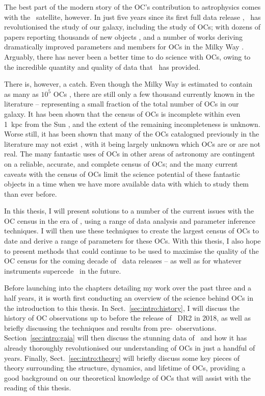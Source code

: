 The best part of the modern story of the OC's contribution to astrophysics comes with the \gaia\ satellite, however. In just five years since its first full data release \citep{brown_gaia_2018}, \gaia\ has revolutionised the study of our galaxy, including the study of OCs; with dozens of papers reporting thousands of new objects \citep[e.g.][]{liu_catalog_2019,castro-ginard_hunting_2019,castro-ginard_hunting_2020,castro-ginard_hunting_2022}, and a number of works deriving dramatically improved parameters and members for OCs in the Milky Way \citep[e.g.][]{cantat-gaudin_gaia_2018,tarricq_3d_2020}. Arguably, there has never been a better time to do science with OCs, owing to the incredible quantity and quality of data that \gaia\ has provided.

There is, however, a catch. Even though the Milky Way is estimated to contain as many as $10^5$ OCs \citep{dias_new_2002}, there are still only a few thousand currently known in the literature -- representing a small fraction of the total number of OCs in our galaxy. It has been shown that the census of OCs is incomplete within even 1~kpc from the Sun \citep[e.g.][]{castro-ginard_new_2018}, and the extent of the remaining incompleteness is unknown. Worse still, it has been shown that many of the OCs catalogued previously in the literature may not exist \citep{cantat-gaudin_clusters_2020,piatti_catching_2023}, with it being largely unknown which OCs are or are not real. The many fantastic uses of OCs in other areas of astronomy are contingent on a reliable, accurate, and complete census of OCs; and the many current caveats with the census of OCs limit the science potential of these fantastic objects in a time when we have more available data with which to study them than ever before.

In this thesis, I will present solutions to a number of the current issues with the OC census in the era of \gaia, using a range of data analysis and parameter inference techniques. I will then use these techniques to create the largest census of OCs to date and derive a range of parameters for these OCs. With this thesis, I also hope to present methods that could continue to be used to maximise the quality of the OC census for the coming decade of \gaia\ data releases -- as well as for whatever instruments supercede \gaia\ in the future.

Before launching into the chapters detailing my work over the past three and a half years, it is worth first conducting an overview of the science behind OCs in the introduction to this thesis. In Sect.~\ref{sec:intro:history}, I will discuss the history of OC observations up to before the release of \gaia\ DR2 in 2018, as well as briefly discussing the techniques and results from pre-\gaia\ observations. Section~\ref{sec:intro:gaia} will then discuss the stunning data of \gaia\ and how it has already thoroughly revolutionised our understanding of OCs in just a handful of years. Finally, Sect.~\ref{sec:intro:theory} will briefly discuss some key pieces of theory surrounding the structure, dynamics, and lifetime of OCs, providing a good background on our theoretical knowledge of OCs that will assist with the reading of this thesis.

